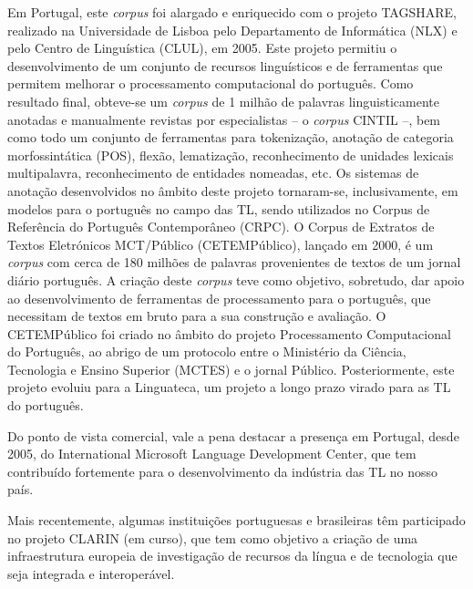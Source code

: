 \documentclass[]{../metanetpaper}
\begin{document}
\begin{multicols}{2}
Em Portugal, este \textit{corpus} foi alargado e enriquecido com o projeto TAGSHARE, realizado na Universidade de Lisboa pelo Departamento de Informática (NLX) e pelo Centro de Linguística (CLUL), em 2005. Este projeto permitiu o desenvolvimento de um conjunto de recursos linguísticos e de ferramentas que permitem melhorar o processamento computacional do português. Como resultado final, obteve-se um \textit{corpus} de 1 milhão de palavras linguisticamente anotadas e manualmente revistas por especialistas – o \textit{corpus} CINTIL\cite{cintil} –, bem como todo um conjunto de ferramentas para tokenização, anotação de categoria morfossintática (POS), flexão, lematização, reconhecimento de unidades lexicais multipalavra, reconhecimento de entidades nomeadas, etc. Os sistemas de anotação desenvolvidos no âmbito deste projeto tornaram-se, inclusivamente, em modelos para o português no campo das TL, sendo utilizados no Corpus de Referência do Português Contemporâneo (CRPC).
O Corpus de Extratos de Textos Eletrónicos MCT/Público (CETEMPúblico), lançado em 2000, é um \textit{corpus} com cerca de 180 milhões de palavras provenientes de textos de um jornal diário português. A criação deste \textit{corpus} teve como objetivo, sobretudo, dar apoio ao desenvolvimento de ferramentas de processamento para o português, que necessitam de textos em bruto para a sua construção e avaliação. O CETEMPúblico foi criado no âmbito do projeto Processamento Computacional do Português, ao abrigo de um protocolo entre o Ministério da Ciência, Tecnologia e Ensino Superior (MCTES) e o jornal Público. Posteriormente, este projeto evoluiu para a Linguateca\cite{linguateca}, um projeto a longo prazo virado para as TL do português.

Do ponto de vista comercial, vale a pena destacar a presença em Portugal, desde 2005, do International Microsoft Language Development Center, que tem contribuído fortemente para o desenvolvimento da indústria das TL no nosso país.

Mais recentemente, algumas instituições portuguesas e brasileiras têm participado no projeto CLARIN (em curso), que tem como objetivo a criação de uma infraestrutura europeia de investigação de recursos da língua e de tecnologia que seja integrada e interoperável.


\end{multicols}
\end{document}
